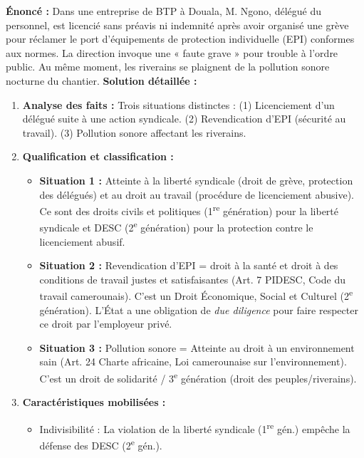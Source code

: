 \documentclass[11pt]{article}
\newcommand{\cle}[1]{{\popxbold\color{popdark}#1}}
\begin{document}
\begin{exoresolu}
    \textbf{Énoncé :} Dans une entreprise de BTP à Douala, M. Ngono, délégué du personnel, est licencié sans préavis ni indemnité après avoir organisé une grève pour réclamer le port d'équipements de protection individuelle (EPI) conformes aux normes. La direction invoque une « faute grave » pour trouble à l'ordre public. Au même moment, les riverains se plaignent de la pollution sonore nocturne du chantier.
    \tcblower
    \textbf{Solution détaillée :}
    \begin{enumerate}
        \item \textbf{Analyse des faits :} Trois situations distinctes : (1) Licenciement d'un délégué suite à une action syndicale. (2) Revendication d'EPI (sécurité au travail). (3) Pollution sonore affectant les riverains.
        \item \textbf{Qualification et classification :}
            \begin{itemize}
                \item \textbf{Situation 1 :} Atteinte à la \cle{liberté syndicale} (droit de grève, protection des délégués) et au \cle{droit au travail} (procédure de licenciement abusive). Ce sont des \cle{droits civils et politiques (1\textsuperscript{re} génération)} pour la liberté syndicale et \cle{DESC (2\textsuperscript{e} génération)} pour la protection contre le licenciement abusif.
                \item \textbf{Situation 2 :} Revendication d'EPI = \cle{droit à la santé} et \cle{droit à des conditions de travail justes et satisfaisantes} (Art. 7 PIDESC, Code du travail camerounais). C'est un \cle{Droit Économique, Social et Culturel (2\textsuperscript{e} génération)}. L'État a une obligation de \emph{due diligence} pour faire respecter ce droit par l'employeur privé.
                \item \textbf{Situation 3 :} Pollution sonore = Atteinte au \cle{droit à un environnement sain} (Art. 24 Charte africaine, Loi camerounaise sur l'environnement). C'est un \cle{droit de solidarité / 3\textsuperscript{e} génération} (droit des peuples/riverains).
            \end{itemize}
        \item \textbf{Caractéristiques mobilisées :}
            \begin{itemize}
                \item \cle{Indivisibilité :} La violation de la liberté syndicale (1\textsuperscript{re} gén.) empêche la défense des DESC (2\textsuperscript{e} gén.).

\end{itemize}
\end{enumerate}
\end{exoresolu}
\end{document}
